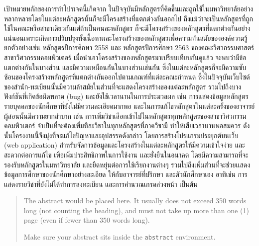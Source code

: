\maketitle
\makesignature

\ifproject
\begin{abstractTH}

    เป้าหมายหลักของการทําโปรเจคนี้เกิดจาก ในปัจจุบันมีหลักสูตรที่คิดขึ้นและถูกใช้ในมหาวิทยาลัยอย่างหลากหลายโดยในแต่ละหลักสูตรนั้นก็จะมีโครงสร้างที่แตกต่างกันออกไป ถึงแม้ว่าจะเป็นหลักสูตรที่ถูกใช้ในคณะหรือสาขาเดียวกันแต่ถ้าเป็นคนละหลักสูตร ก็จะมีโครงสร้างของหลักสูตรที่แตกต่างกันอย่างแน่นอนเพราะเกิดการปรับปรุงทั้งเนื้อหาเเละโครงสร้างของหลักสูตรเพื่อความทันสมัยขององค์ความรู้ ยกตัวอย่างเช่น หลักสูตรปีการศึกษา 2558 และ หลักสูตรปีการศึกษา 2563 ของคณะวิศวกรรมศาสตร์ สาขาวิศวกรรมคอมพิวเตอร์ เมื่อนำเอาโครงสร้างของหลักสูตรมาเปรียบเทียบกันดูแล้ว จะพบว่ามีข้อแตกต่างกันในบางส่วน และมีความเหมือนกันในบางส่วนเช่นกัน ซึ่งในแต่ละหลักสูตรก็จะมีความซับซ้อนของโครงสร้างหลักสูตรที่แตกต่างกันออกไปตามเกณฑ์ที่แต่ละคณะกำหนด ซึ่งในปัจจุบันเว็บไซต์ของสำนัก-ทะเบียนนั้นมีความล้าสมัยในส่วนที่จะแสดงโครงสร้างของแต่ละหลักสูตร รวมไปถึงบางฟังก์ชันที่เกิดข้อผิดพลาด (bug) และยังใช้เวลานานในการประมวลผล เช่น การแสดงข้อมูลหลักสูตรรายบุคคลของนักศึกษาที่ยังไม่มีความละเอียดมากพอ และในการแก้ไขหลักสูตรในแต่ละครั้งของอาจารย์ผู้สอนนั้นมีความยากลำบาก เช่น การเพิ่มวิชาเลือกเข้าไปในหลักสูตรทุกหลักสูตรของสาขาวิศวกรรมคอมพิวเตอร์ จำเป็นที่จะต้องเพิ่มทีละวิชาในทุกหลักสูตรที่ภาควิชามี ทำให้เสียเวลานานพอสมควร ดังนั้นโครงงานนี้จึงมุ่งที่จะแก้ไขปัญหาและอุปสรรคดังกล่าว โดยการสร้างโปรแกรมประยุกต์บนเว็บ (web application) สําหรับจัดการข้อมูลและโครงสร้างในแต่ละหลักสูตรให้มีความเข้าใจง่าย และสะดวกต่อการแก้ไข เพื่อเพิ่มประสิทธิภาพในการใช้งาน เเละยั่งยืนในอนาคต โดยมีความสามารถที่จะรองรับหลักสูตรในมหาวิทยาลัย และยืดหยุ่นต่อการใช้เรียกงานต่างๆ รวมไปถึงเพิ่มส่วนที่จะช่วยเเสดงข้อมูลการศึกษาของนักศึกษาอย่างละเอียด ให้กับอาจารย์ที่ปรึกษา และตัวนักศึกษาเอง อาทิเช่น การแสดงรายวิชาที่ยังไม่ได้ทำการลงทะเบียน และการคำนวณเกรดล่วงหน้า เป็นต้น 

\end{abstractTH}

\begin{abstract}
The abstract would be placed here. It usually does not exceed 350 words
long (not counting the heading), and must not take up more than one (1) page
(even if fewer than 350 words long).

Make sure your abstract sits inside the \texttt{abstract} environment.
\end{abstract}


